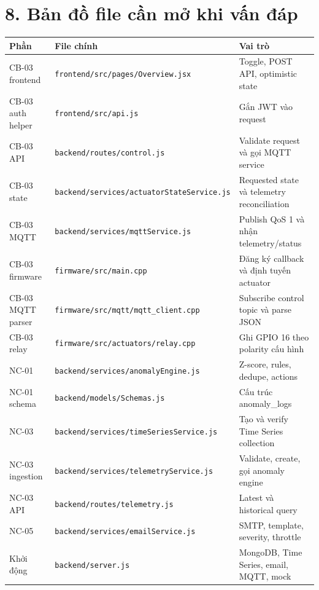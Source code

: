 \documentclass[11pt,oneside,openany]{book}
\newcounter{none}
\renewcommand{\texttt}[1]{{\ttfamily\small #1}}
\let\oldtoprule\toprule
\renewcommand{\toprule}{\arrayrulecolor{Accent}\oldtoprule\arrayrulecolor{RuleColor}}
\begin{document}
\section{8. Bản đồ file cần mở khi vấn
đáp}\label{8-bux1ea3n-ux111ux1ed3-file-cux1ea7n-mux1edf-khi-vux1ea5n-ux111uxe1p}

{\def\LTcaptype{none} %
\begin{longtable}[]{@{}
  >{\raggedright\arraybackslash}p{}
  >{\raggedright\arraybackslash}p{}
  >{\raggedright\arraybackslash}p{}@{}}
\toprule\noalign{}
\begin{minipage}[b]{\linewidth}\raggedright
Phần
\end{minipage} & \begin{minipage}[b]{\linewidth}\raggedright
File chính
\end{minipage} & \begin{minipage}[b]{\linewidth}\raggedright
Vai trò
\end{minipage} \\
\midrule\noalign{}
\endhead
\bottomrule\noalign{}
\endlastfoot
CB-03 frontend & \nolinkurl{frontend/src/pages/Overview.jsx} & Toggle,
POST API, optimistic state \\
CB-03 auth helper & \nolinkurl{frontend/src/api.js} & Gắn JWT vào
request \\
CB-03 API & \nolinkurl{backend/routes/control.js} & Validate request và
gọi MQTT service \\
CB-03 state & \nolinkurl{backend/services/actuatorStateService.js} &
Requested state và telemetry reconciliation \\
CB-03 MQTT & \nolinkurl{backend/services/mqttService.js} & Publish QoS 1
và nhận telemetry/status \\
CB-03 firmware & \nolinkurl{firmware/src/main.cpp} & Đăng ký callback và
định tuyến actuator \\
CB-03 MQTT parser & \nolinkurl{firmware/src/mqtt/mqtt_client.cpp} &
Subscribe control topic và parse JSON \\
CB-03 relay & \nolinkurl{firmware/src/actuators/relay.cpp} & Ghi GPIO 16
theo polarity cấu hình \\
NC-01 & \nolinkurl{backend/services/anomalyEngine.js} & Z-score, rules,
dedupe, actions \\
NC-01 schema & \nolinkurl{backend/models/Schemas.js} & Cấu trúc
\texttt{anomaly\_logs} \\
NC-03 & \nolinkurl{backend/services/timeSeriesService.js} & Tạo và
verify Time Series collection \\
NC-03 ingestion & \nolinkurl{backend/services/telemetryService.js} &
Validate, create, gọi anomaly engine \\
NC-03 API & \nolinkurl{backend/routes/telemetry.js} & Latest và
historical query \\
NC-05 & \nolinkurl{backend/services/emailService.js} & SMTP, template,
severity, throttle \\
Khởi động & \nolinkurl{backend/server.js} & MongoDB, Time Series, email,
MQTT, mock \\
\end{longtable}
}
\end{document}
